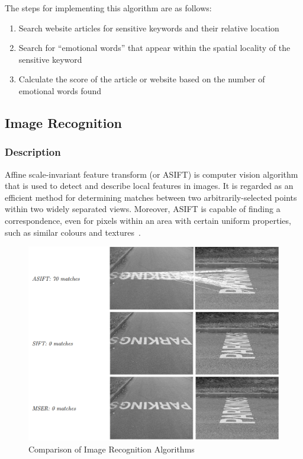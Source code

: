       The steps for implementing this algorithm are as follows:
      \begin{enumerate}
        \item Search website articles for sensitive keywords and their relative location
        \item Search for ``emotional words'' that appear within the spatial locality of the sensitive keyword
        \item Calculate the score of the article or website based on the number of emotional words found
      \end{enumerate}

  \subsection{Image Recognition}

    \subsubsection{Description}

      Affine scale-invariant feature transform (or ASIFT) is computer vision algorithm that is used to detect and describe local features in images. It is regarded as an efficient method for determining matches between two arbitrarily-selected points within two widely separated views. Moreover, ASIFT is capable of finding a correspondence, even for pixels within an area with certain uniform properties, such as similar colours and textures~\parencite{book:pod_14}.

      \begin{figure}
        \centering
        \begin{minipage}{12cm}
          \centering
          \includegraphics[width=12cm]{inc/image_recognition_comparison.png}
          \caption{Comparison of Image Recognition Algorithms}
          \label{fig:image_recognition_comparison}
        \end{minipage}
      \end{figure}

